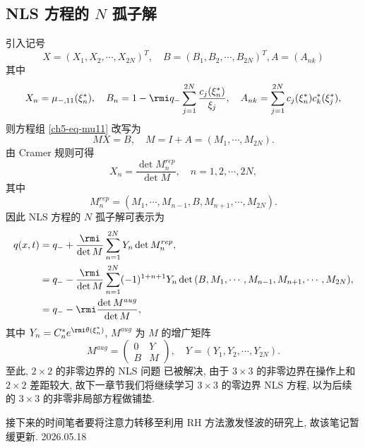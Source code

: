 \subsection{NLS 方程的 $N$ 孤子解}
引入记号
\begin{equation}
    X = (X_{1}, X_{2}, \cdots, X_{2N})^{T}, \quad B = (B_{1}, B_{2}, \cdots, B_{2N})^{T}, A = (A_{nk})
\end{equation}
其中
\begin{equation}
    X_{n} = \mu_{-,11}(\xi_{n}^{*}), \quad B_{n} = 1 - \rmi q_{-} \sum_{j=1}^{2N} \frac{c_{j}(\xi_{n}^{*})}{\xi_{j}}, \quad A_{nk} = \sum_{j=1}^{2N} c_{j}(\xi_{n}^{*}) c_{k}^{*}(\xi_{j}^{*}),
\end{equation}
则方程组 \eqref{ch5-eq-mu11} 改写为
\begin{equation}
    M X = B, \quad M = I + A = (M_{1}, \cdots, M_{2N}).
\end{equation}
由 Cramer 规则可得
\begin{equation}
    X_{n} = \frac{\det{M_{n}^{rep}}}{\det{M}}, \quad n = 1, 2, \cdots, 2 N,
\end{equation}
其中
\begin{equation}
    M_{n}^{rep} = (M_{1}, \cdots, M_{n-1}, B, M_{n+1}, \cdots, M_{2N}).
\end{equation}
因此 NLS 方程的 $N$ 孤子解可表示为
\begin{equation}
    \begin{aligned}
        q(x,t) & = q_{-} + \frac{\rmi}{\det{M}} \sum_{n=1}^{2N} Y_{n} \det{M_{n}^{rep}},                                                       \\
               & = q_{-} - \frac{\rmi}{\det{M}} \sum_{n=1}^{2N} (-1)^{1+n+1} Y_{n} \det{(B, M_{1}, \cdots, M_{n-1}, M_{n+1}, \cdots, M_{2N})}, \\
               & = q_{-} - \rmi \frac{\det{M^{aug}}}{\det{M}},
    \end{aligned}
\end{equation}
其中 $Y_{n} = C_{n}^{*} e^{\rmi \theta(\xi_{n}^{*})}$, $M^{aug}$ 为 $M$ 的增广矩阵
\begin{equation}
    M^{aug} = \begin{pmatrix}
        0 & Y \\ B & M
    \end{pmatrix}, \quad Y = (Y_{1}, Y_{2}, \cdots, Y_{2N}).
\end{equation}
至此, $2 \times 2$ 的非零边界的 NLS 问题 已被解决, 由于 $3 \times 3$ 的非零边界在操作上和 $2 \times 2$ 差距较大, 故下一章节我们将继续学习 $3 \times 3$ 的零边界 NLS 方程, 以为后续的 $3 \times 3$ 的非零非局部方程做铺垫.

接下来的时间笔者要将注意力转移至利用 RH 方法激发怪波的研究上, 故该笔记暂缓更新. 2026.05.18
